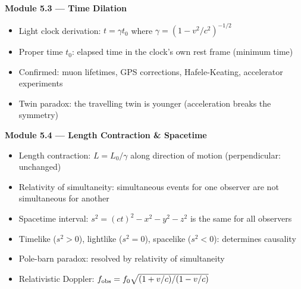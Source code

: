 \documentclass[12pt, a4paper, twoside]{book}
\begin{document}
\begin{tcolorbox}[enhanced,colback=deep!4,colframe=deep,
  title={\bfseries\color{white} Key Ideas: Modules 5.3--5.4},
  attach boxed title to top left={yshift=-2mm,xshift=4mm},
  boxed title style={colback=deep}]
\textbf{Module 5.3 --- Time Dilation}
\begin{itemize}[leftmargin=1.5em,itemsep=2pt]
  \item Light clock derivation: $t = \gamma t_0$ where $\gamma = (1-v^2/c^2)^{-1/2}$
  \item Proper time $t_0$: elapsed time in the clock's own rest frame (minimum time)
  \item Confirmed: muon lifetimes, GPS corrections, Hafele-Keating, accelerator experiments
  \item Twin paradox: the travelling twin is younger (acceleration breaks the symmetry)
\end{itemize}
\vspace{6pt}
\textbf{Module 5.4 --- Length Contraction \& Spacetime}
\begin{itemize}[leftmargin=1.5em,itemsep=2pt]
  \item Length contraction: $L = L_0/\gamma$ along direction of motion (perpendicular: unchanged)
  \item Relativity of simultaneity: simultaneous events for one observer are not simultaneous for another
  \item Spacetime interval: $s^2 = (ct)^2 - x^2 - y^2 - z^2$ is the same for all observers
  \item Timelike ($s^2>0$), lightlike ($s^2=0$), spacelike ($s^2<0$): determines causality
  \item Pole-barn paradox: resolved by relativity of simultaneity
  \item Relativistic Doppler: $f_{\rm obs} = f_0\sqrt{(1+v/c)/(1-v/c)}$
\end{itemize}
\end{tcolorbox}

\vspace{0.5cm}
\begin{center}
\end{center}
\end{document}
